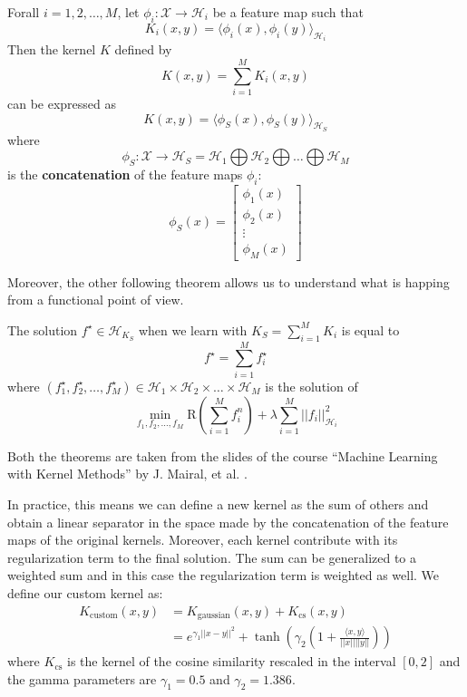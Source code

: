 \begin{theorem}
Forall $i = 1, 2, \dots, M$, let $\phi_i : \mathcal{X} \rightarrow \mathcal{H}_i$ be a feature map such that 
$$
    K_i (x, y) = \langle \phi_i(x), \phi_i(y) \rangle_{\mathcal{H}_i}
$$
Then the kernel $K$ defined by
$$
    K(x, y) = \sum_{i=1}^M K_i(x, y)
$$
can be expressed as
$$
    K(x, y) = \langle \phi_S(x), \phi_S(y) \rangle_{\mathcal{H}_S}
$$
where 
$$
\phi_S : \mathcal{X} \rightarrow \mathcal{H}_S = \mathcal{H}_1 \bigoplus \mathcal{H}_2 \bigoplus \dots \bigoplus \mathcal{H}_M
$$
is the \textbf{concatenation} of the feature maps $\phi_i$:
$$
    \phi_S(x) = \left[ \begin{array}{c} \phi_1(x) \\ \phi_2(x) \\ \vdots \\ \phi_M(x) \end{array} \right]
$$
\end{theorem}

Moreover, the other following theorem allows us to understand what is
happing from a functional point of view.

\begin{theorem}
The solution $f^{\star} \in \mathcal{H}_{K_S}$ when we learn with 
$K_S = \sum_{i=1}^{M} K_i$ is equal to
$$
    f^{\star} = \sum_{i=1}^{M} f^{\star}_i
$$
where $(f^{\star}_1, f^{\star}_2, \dots, f^{\star}_M) \in \mathcal{H}_1 \times \mathcal{H}_2 \times \dots \times \mathcal{H}_M$
is the solution of
$$
    \min_{f_1, f_2, \dots, f_M} \text{R}(\sum_{i=1}^{M} f_i^n) + \lambda \sum_{i=1}^{M} || f_i ||_{\mathcal{H}_i}^2
$$
\end{theorem}
Both the theorems are taken from the slides of the course
\enquote{Machine Learning with Kernel Methods} by J. Mairal, et al.
\cite{mairal2022kernelmethods}.


In practice, this means we can define a new kernel as the sum of others
and obtain a linear separator in the space made by the concatenation of
the feature maps of the original kernels. Moreover, each kernel contribute
with its regularization term to the final solution. The sum can be generalized
to a weighted sum and in this case the regularization term is weighted as well.
We define our custom kernel as:
\begin{align*}
    K_{\text{custom}}(x, y) &= K_{\text{gaussian}}(x, y) + K_{\text{cs}}(x, y) \\
    &= e^{\gamma_1 ||x-y||^2} + \tanh( \gamma_2 \left( 1 + \frac{\langle x, y \rangle}{||x|| ||y||} \right) )
\end{align*}
where $K_{\text{cs}}$ is the kernel of the cosine similarity rescaled
in the interval $[0, 2]$ and the gamma parameters are $\gamma_1=0.5$ and
$\gamma_2=1.386$.

